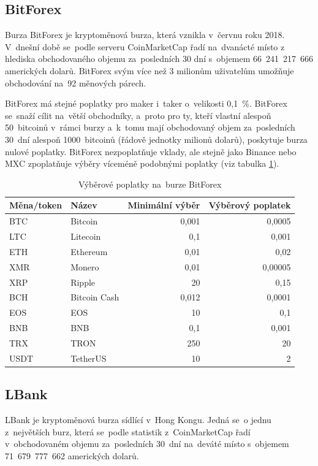 \documentclass[thesis=B,czech]{FITthesis}[2019/03/21]
\begin{document}
\subsection{BitForex}
Burza BitForex je kryptoměnová burza, která vznikla v~červnu roku 2018. V~dnešní době se~podle serveru CoinMarketCap řadí na~dvanácté místo z hlediska obchodovaného objemu za~posledních 30 dní s~objemem 66~241~217~666 amerických dolarů. \cite{coinmarketcap} BitForex svým více než 3 milionům uživatelům \linebreak umožňuje obchodování na~92 měnových párech.  \cite{cryptowisser_bitforex}

BitForex má stejné poplatky pro maker i~taker o~velikosti 0,1~\%. BitForex se~snaží cílit na~větší obchodníky, a~proto pro ty, kteří vlastní alespoň 50~bitcoinů v~rámci burzy a~k~tomu mají obchodovaný objem za~posledních 30~dní alespoň 1000~bitcoinů (řádově jednotky milionů dolarů), poskytuje burza nulové poplatky. BitForex nezpoplatňuje vklady, ale stejně jako Binance nebo MXC zpoplatňuje výběry víceméně podobnými poplatky (viz tabulka \ref{bitforex_fees}). \cite{cryptowisser_bitforex}

\begin{table}\centering
    \caption{Výběrové poplatky na~burze BitForex \cite{bitforex_fees}}
    \label{bitforex_fees}
    \begin{tabular}{||l | l | r | r||} 
     \hline
     Měna/token & Název & Minimální výběr & Výběrový poplatek \\ [0.5ex] 
     \hline\hline
     BTC & Bitcoin & 0,001 & 0,0005 \\ 
     \hline
     LTC & Litecoin & 0,1 & 0,001 \\
     \hline
     ETH & Ethereum & 0,01 & 0,02 \\
     \hline
     XMR & Monero & 0,01 & 0,00005 \\
     \hline
     XRP & Ripple & 20 & 0,15 \\
     \hline
     BCH & Bitcoin Cash & 0,012 & 0,0001 \\
     \hline
     EOS & EOS & 10 & 0,1 \\
     \hline
     BNB & BNB & 0,1 & 0,001 \\
     \hline
     TRX & TRON & 250 & 20 \\
     \hline
     USDT & TetherUS & 10 & 2 \\
     \hline
    \end{tabular}
\end{table}

\subsection{LBank}
LBank je kryptoměnová burza sídlící v~Hong Kongu. Jedná se~o jednu \linebreak z~největších burz, která se~podle statistik z~CoinMarketCap řadí v~obchodovaném objemu za~posledních 30~dní na~deváté místo s~objemem 71~679~777~662 amerických dolarů. \cite{coinmarketcap} \cite{cryptowisser_lbank}
\end{document}
